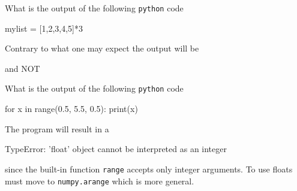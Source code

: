 \documentclass[12pt,a4paper]{exam}
\begin{document}
\begin{questions}
\question
What is the output of the following \texttt{python} code

\begin{ipython}
mylist = [1,2,3,4,5]*3
\end{ipython}
\fillwithlines{3cm}
\begin{solution}
Contrary to what one may expect the output will be
\begin{ioutput}
[1,2,3,4,5,1,2,3,4,5,1,2,3,4,5]
\end{ioutput}
and NOT
\begin{ioutput}
[3,6,9,12,15]
\end{ioutput}
\end{solution}
\question
What is the output of the following \texttt{python} code

\begin{ipython}
for x in range(0.5, 5.5, 0.5):
    print(x)
\end{ipython}
\fillwithlines{3cm}
\begin{solution}
The program will result in a
\begin{ioutput}
TypeError: 'float' object cannot be interpreted as an integer
\end{ioutput}
since the built-in function \texttt{range} accepts only integer arguments. To use floats must move to \texttt{numpy.arange} which is more general.
\end{solution}

\end{questions}
\end{document}
